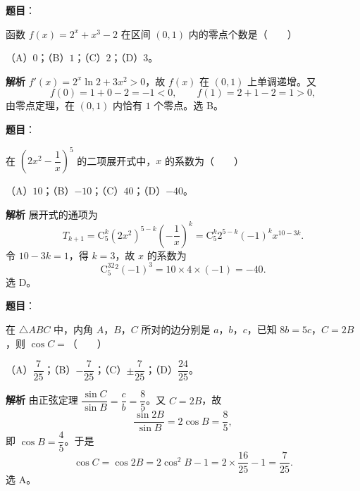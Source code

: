 \begin{answer}

\textbf{题目}：

函数 $f(x)=2^x+x^3-2$ 在区间 $(0,1)$ 内的零点个数是\mbox{（　　）}

（A）$0$；（B）$1$；（C）$2$；（D）$3$。

\textbf{解析}
$f'(x)=2^x\ln2+3x^2>0$，故 $f(x)$ 在 $(0,1)$ 上单调递增。又
\nopagebreak[4]
\[f(0)=1+0-2=-1<0,\qquad f(1)=2+1-2=1>0,\]
由零点定理，在 $(0,1)$ 内恰有 $1$ 个零点。选 B。


\end{answer}
\begin{answer}

\textbf{题目}：

在 $\left(2x^2-\dfrac1x\right)^5$ 的二项展开式中，$x$ 的系数为\mbox{（　　）}

（A）$10$；（B）$-10$；（C）$40$；（D）$-40$。

\textbf{解析}
展开式的通项为
\nopagebreak[4]
\[T_{k+1}=\mathrm C_5^k(2x^2)^{5-k}\left(-\frac1x\right)^k=\mathrm C_5^k2^{5-k}(-1)^kx^{10-3k}.\]
令 $10-3k=1$，得 $k=3$，故 $x$ 的系数为
\nopagebreak[4]
\[\mathrm C_5^32^2(-1)^3=10\times4\times(-1)=-40.\]
选 D。


\end{answer}
\begin{answer}

\textbf{题目}：

在 $\triangle ABC$ 中，内角 $A$，$B$，$C$ 所对的边分别是 $a$，$b$，$c$，已知 $8b=5c$，$C=2B$，则 $\cos C=$\mbox{（　　）}

（A）$\dfrac7{25}$；（B）$-\dfrac7{25}$；（C）$\pm\dfrac7{25}$；（D）$\dfrac{24}{25}$。

\textbf{解析}
由正弦定理 $\dfrac{\sin C}{\sin B}=\dfrac cb=\dfrac85$。又 $C=2B$，故
\nopagebreak[4]
\[\frac{\sin2B}{\sin B}=2\cos B=\frac85,\]
即 $\cos B=\dfrac45$。于是
\nopagebreak[4]
\[\cos C=\cos2B=2\cos^2B-1=2\times\frac{16}{25}-1=\frac7{25}.\]
选 A。


\end{answer}
